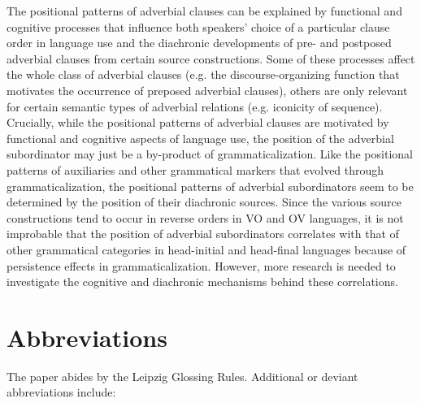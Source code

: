 \documentclass[output=paper]{langsci/langscibook}
\begin{document}
The positional patterns of adverbial clauses 
\label{p:diessel:preposedadverbialclauses}
can be explained by functional and cognitive processes that influence both speakers’ choice of a particular clause order in language use and the diachronic developments of pre- and postposed adverbial clauses from certain source constructions. Some of these processes affect the whole class of adverbial clauses (e.g. the discourse-organizing function that motivates the occurrence of preposed adverbial clauses), others are only relevant for certain semantic types of adverbial relations (e.g. iconicity of sequence). Crucially, while the positional patterns of adverbial clauses are motivated by functional and cognitive aspects of language use, the position of the adverbial subordinator may just be a by-product of grammaticalization. Like the positional patterns of auxiliaries and other grammatical markers that evolved through grammaticalization, the positional patterns of adverbial subordinators seem to be determined by the position of their diachronic sources. Since the various source constructions tend to occur in reverse orders in VO and OV languages, it is not improbable that the position of adverbial subordinators correlates with that of other grammatical categories in head-initial and head-final languages because of persistence effects in grammaticalization. However, more research is needed to investigate the cognitive and diachronic mechanisms behind these correlations.

\section*{Abbreviations}

The paper abides by the Leipzig Glossing Rules. Additional or deviant abbreviations include:
\end{document}
